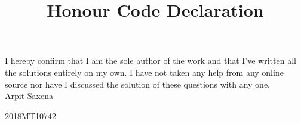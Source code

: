 \documentclass{article}
\title{Honour Code Declaration}
\begin{document}
    \maketitle
    I hereby confirm that I am the sole author of the work and that I've
    written all the solutions entirely on my own.
    I have not taken any help from any online source nor have I discussed
    the solution of these questions with any one.\\

    Arpit Saxena
    
    2018MT10742
\end{document}
